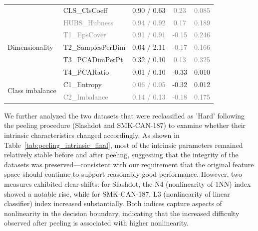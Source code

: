 \documentclass[preprint,12pt,authoryear]{elsarticle}
\begin{document}
\begin{table}[h!]
\begin{tabular}{llccc}
 & CLS\_ClsCoeff & 0.90 / 0.63 & \textcolor{gray}{0.23} & \textcolor{gray}{0.085} \\
 & \textcolor{gray}{HUBS\_Hubness} & \textcolor{gray}{0.94 / 0.92} & \textcolor{gray}{0.17} & \textcolor{gray}{0.189} \\
\midrule
\multirow{3}{*}{Dimensionality}
 & \textcolor{gray}{T1\_EpsCover} & \textcolor{gray}{0.91 / 0.91} & \textcolor{gray}{-0.15} & \textcolor{gray}{0.246} \\
 & T2\_SamplesPerDim & 0.04 / 2.11 & \textcolor{gray}{-0.17 }& \textcolor{gray}{0.166} \\
 & {T3\_PCADimPerPt} & {0.32 / 0.10} & \textcolor{gray}{0.13} & \textcolor{gray}{0.325} \\
 & T4\_PCARatio & 0.01 / 0.10 & -0.33 & 0.010 \\
\midrule
\multirow{2}{*}{Class imbalance}
 & C1\_Entropy & \textcolor{gray}{0.06 / 0.05} & -0.32 & 0.012 \\
 & \textcolor{gray}{C2\_Imbalance} & \textcolor{gray}{0.14 / 0.13} & \textcolor{gray}{-0.18} & \textcolor{gray}{0.175} \\
\bottomrule
\end{tabular}
\end{table}


We further analyzed the two datasets that were reclassified as 'Hard' following the peeling procedure (Slashdot and SMK-CAN-187) to examine whether their intrinsic characteristics changed accordingly. As shown in Table~\ref{tab:peeling_intrinsic_final}, most of the intrinsic parameters remained relatively stable before and after peeling, suggesting that the integrity of the datasets was preserved—consistent with our requirement that the original feature space should continue to support reasonably good performance. However, two measures exhibited clear shifts: for Slashdot, the  N4 (nonlinearity of 1NN) index showed a notable rise, while for SMK-CAN-187, L3 (nonlinearity of linear classifier) index increased substantially. Both indices capture aspects of nonlinearity in the decision boundary, indicating that the increased difficulty observed after peeling is associated with higher nonlinearity. 
\end{document}

